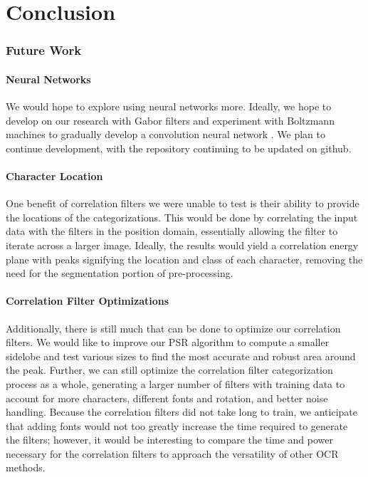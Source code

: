\section{Conclusion}

\subsubsection{Future Work}

\paragraph{Neural Networks} We would hope to explore using neural networks
more. Ideally, we hope to develop on our research with Gabor filters and experiment
with Boltzmann machines to gradually develop a convolution neural network \cite{yannle, yannle2}.
We plan to continue development, with the repository continuing to be
updated on github.

\paragraph{Character Location} One benefit of 
correlation filters we were unable to test is their 
ability to provide the locations of the categorizations. 
This would be done by correlating the input data with the 
filters in the position domain, essentially allowing the filter 
to iterate across a larger image. Ideally, the results would 
yield a correlation energy plane with peaks signifying the location 
and class of each character, removing the need for the 
segmentation portion of pre-processing.

\paragraph{Correlation Filter Optimizations} Additionally, 
there is still much that can be done to optimize our 
correlation filters. We would like to improve our PSR 
algorithm to compute a smaller sidelobe and test various 
sizes to find the most accurate and robust area around the 
peak. Further, we can still optimize the correlation filter 
categorization process as a whole, generating a larger number 
of filters with training data to account for more characters, 
different fonts and rotation, and better noise handling. Because 
the correlation filters did not take long to train, we anticipate 
that adding fonts would not too greatly increase the time required 
to generate the filters; however, it would be interesting to compare 
the time and power necessary for the correlation filters to approach 
the versatility of other OCR methods.

